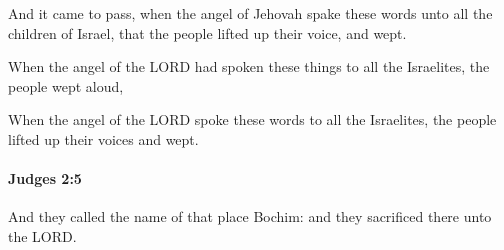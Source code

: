 			\begin{versebox}
					\item[BHS] 
					\item[ASV] And it came to pass, when the angel of Jehovah spake these words unto all the children of Israel, that the people lifted up their voice, and wept.
					\item[NIV] When the angel of the LORD had spoken these things to all the Israelites, the people wept aloud,
					\item[NRSV] When the angel of the LORD spoke these words to all the Israelites, the people lifted up their voices and wept.
			\end{versebox}

		\paragraph{Judges 2:5} %
			\label{JUDGES-2-5}

			And they called the name of that place Bochim: and they sacrificed there unto the LORD.

